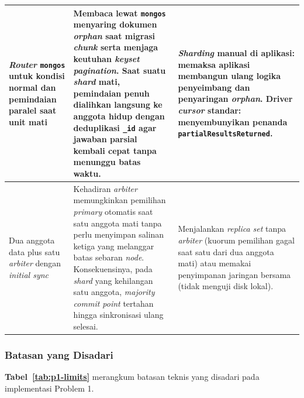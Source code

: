 \begin{small}
\begin{longtable}{@{} >{\raggedright\arraybackslash}p{3.4cm} >{\raggedright\arraybackslash}p{7.4cm} >{\raggedright\arraybackslash}p{4.0cm} @{}}
  \midrule
  \textit{Router} \texttt{mongos} untuk kondisi normal dan pemindaian paralel saat unit mati & Membaca lewat \texttt{mongos} menyaring dokumen \textit{orphan} saat migrasi \textit{chunk} serta menjaga keutuhan \textit{keyset pagination}. Saat suatu \textit{shard} mati, pemindaian penuh dialihkan langsung ke anggota hidup dengan deduplikasi \texttt{\_id} agar jawaban parsial kembali cepat tanpa menunggu batas waktu. & \textbf{\textit{Sharding} manual di aplikasi:} memaksa aplikasi membangun ulang logika penyeimbang dan penyaringan \textit{orphan}. \textbf{Driver \textit{cursor} standar:} menyembunyikan penanda \texttt{partial\allowbreak Results\allowbreak Returned}. \\
  \midrule
  Dua anggota data plus satu \textit{arbiter} dengan \textit{initial sync} & Kehadiran \textit{arbiter} memungkinkan pemilihan \textit{primary} otomatis saat satu anggota mati tanpa perlu menyimpan salinan ketiga yang melanggar batas sebaran \textit{node}. Konsekuensinya, pada \textit{shard} yang kehilangan satu anggota, \textit{majority commit point} tertahan hingga sinkronisasi ulang selesai. & Menjalankan \textit{replica set} tanpa \textit{arbiter} (kuorum pemilihan gagal saat satu dari dua anggota mati) atau memakai penyimpanan jaringan bersama (tidak menguji disk lokal). \\
\end{longtable}
\end{small}

\subsubsection{Batasan yang Disadari}

\textbf{Tabel~\ref{tab:p1-limits}} merangkum batasan teknis yang disadari pada implementasi Problem 1.


